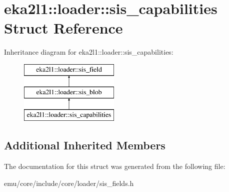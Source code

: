 \hypertarget{structeka2l1_1_1loader_1_1sis__capabilities}{}\section{eka2l1\+:\+:loader\+:\+:sis\+\_\+capabilities Struct Reference}
\label{structeka2l1_1_1loader_1_1sis__capabilities}
Inheritance diagram for eka2l1\+:\+:loader\+:\+:sis\+\_\+capabilities\+:\begin{figure}[H]
\begin{center}
\leavevmode
\includegraphics[height=3.000000cm]{structeka2l1_1_1loader_1_1sis__capabilities}
\end{center}
\end{figure}
\subsection*{Additional Inherited Members}


The documentation for this struct was generated from the following file\+:\begin{DoxyCompactItemize}
\item 
emu/core/include/core/loader/sis\+\_\+fields.\+h\end{DoxyCompactItemize}
